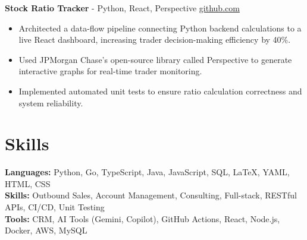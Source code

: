 \documentclass[11pt]{article}       %
\begin{document}
\textbf{Stock Ratio Tracker}{ - Python, React, Perspective} \hfill \href{https://github.com/Monica20030707/Trading-Dashboard_UI}{github.com} \\
\vspace{-9pt}
\begin{itemize}
  \item Architected a data-flow pipeline connecting Python backend calculations to a live React dashboard, increasing trader decision-making efficiency by 40\%.
  \item Used JPMorgan Chase’s open-source library called Perspective to generate interactive graphs for real-time trader monitoring.
  \item Implemented automated unit tests to ensure ratio calculation correctness and system reliability.
\end{itemize}

\vspace{-18.5pt}


\section*{Skills}
\textbf{Languages:} Python, Go, TypeScript, Java, JavaScript, SQL, LaTeX, YAML, HTML, CSS\\
\textbf{Skills:} Outbound Sales, Account Management, Consulting, Full-stack, RESTful APIs, CI/CD, Unit Testing\\
\textbf{Tools:} CRM, AI Tools (Gemini, Copilot), GitHub Actions, React, Node.js, Docker, AWS, MySQL\\

\vspace{-6.5pt}
\end{document}
